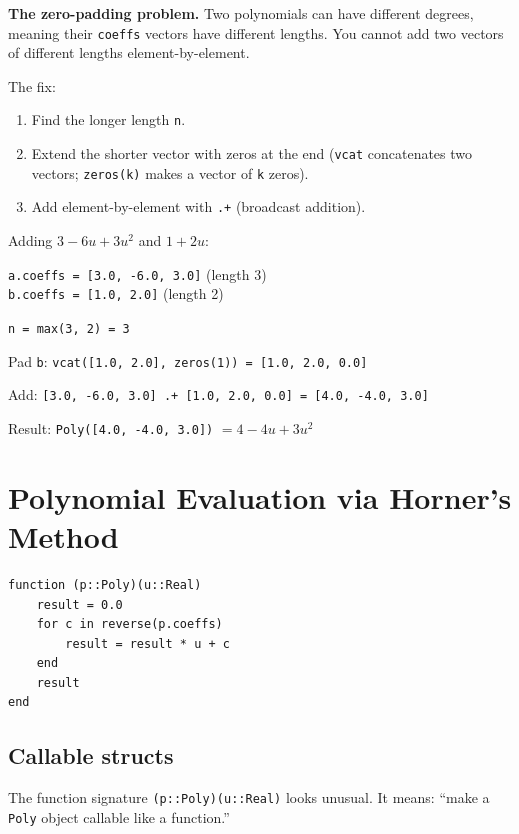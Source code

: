 \documentclass[12pt, a4paper]{article}
\newcommand{\cd}[1]{\texttt{#1}}
\begin{document}
\textbf{The zero-padding problem.}
Two polynomials can have different degrees, meaning their
\cd{coeffs} vectors have different lengths.
You cannot add two vectors of different lengths element-by-element.

The fix:
\begin{enumerate}
  \item Find the longer length \cd{n}.
  \item Extend the shorter vector with zeros at the end
        (\cd{vcat} concatenates two vectors;
        \cd{zeros(k)} makes a vector of \cd{k} zeros).
  \item Add element-by-element with \cd{.+} (broadcast addition).
\end{enumerate}

\begin{examplebox}
Adding $3 - 6u + 3u^2$ and $1 + 2u$:

\medskip
\cd{a.coeffs = [3.0, -6.0, 3.0]} (length 3) \\
\cd{b.coeffs = [1.0,  2.0]}      (length 2)

\medskip
\cd{n = max(3, 2) = 3}

Pad \cd{b}: \cd{vcat([1.0, 2.0], zeros(1)) = [1.0, 2.0, 0.0]}

Add: \cd{[3.0, -6.0, 3.0] .+ [1.0, 2.0, 0.0] = [4.0, -4.0, 3.0]}

Result: \cd{Poly([4.0, -4.0, 3.0])} $= 4 - 4u + 3u^2$
\end{examplebox}


\section{Polynomial Evaluation via Horner's Method}

\begin{verbatim}
function (p::Poly)(u::Real)
    result = 0.0
    for c in reverse(p.coeffs)
        result = result * u + c
    end
    result
end
\end{verbatim}

\subsection{Callable structs}

The function signature \cd{(p::Poly)(u::Real)} looks unusual.
It means: ``make a \cd{Poly} object callable like a function.''
\end{document}
